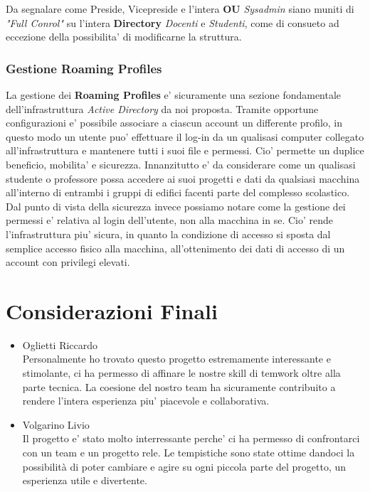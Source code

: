 \documentclass{report}
\begin{document}
            Da segnalare come Preside, Vicepreside e l'intera \textbf{OU} \emph{Sysadmin} siano muniti di
             \emph{"Full Conrol"} su l'intera \textbf{Directory} \emph{Docenti} e \emph{Studenti}, come di
             consueto ad eccezione della possibilita' di modificarne la struttura.
            \subsection{Gestione Roaming Profiles}
            La gestione dei \textbf{Roaming Profiles} e' sicuramente una sezione fondamentale dell'infrastruttura
             \emph{Active Directory} da noi proposta. Tramite opportune configurazioni e' possibile associare 
             a ciascun account un differente profilo, in questo modo un utente puo' effettuare il log-in da un
             qualisasi computer collegato all'infrastruttura e mantenere tutti i suoi file e permessi.
            Cio' permette un duplice beneficio, mobilita' e sicurezza. Innanzitutto e' da considerare come 
             un qualisasi studente o professore possa accedere ai suoi progetti e dati da qualsiasi macchina 
             all'interno di entrambi i gruppi di edifici facenti parte del complesso scolastico. Dal punto 
             di vista della sicurezza invece possiamo notare come la gestione dei permessi e' relativa al
             login dell'utente, non alla macchina in se. Cio' rende l'infrastruttura piu' sicura, in quanto
             la condizione di accesso si sposta dal semplice accesso fisico alla macchina, all'ottenimento dei
             dati di accesso di un account con privilegi elevati.
    \chapter{Considerazioni Finali}
            \begin{itemize}
                \item Oglietti Riccardo\\
                    Personalmente ho trovato questo progetto estremamente interessante e stimolante, ci ha permesso di
                    affinare le nostre skill di temwork oltre alla parte tecnica. La coesione del nostro team ha
                    sicuramente contribuito a rendere l'intera esperienza piu' piacevole e collaborativa.
                \item Volgarino Livio\\
                    Il progetto e' stato molto interressante perche' ci ha permesso di confrontarci con un team e un progetto
                    rele. Le tempistiche sono state ottime dandoci la possibilità di poter cambiare e agire su ogni piccola
                    parte del progetto, un esperienza utile e divertente. 
            \end{itemize}
 
\end{document}
